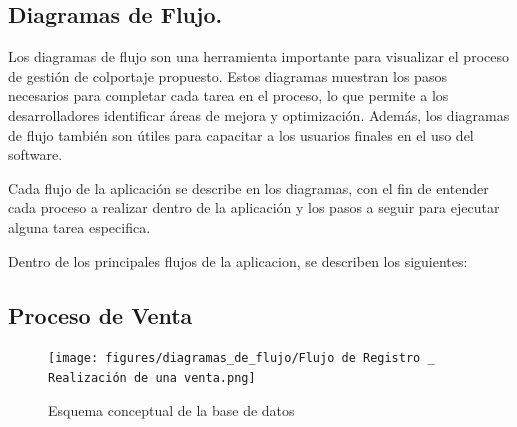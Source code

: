 \documentclass[runningheads]{llncs}
\begin{document}
\subsection{Diagramas de Flujo.}
Los diagramas de flujo son una herramienta importante para visualizar el proceso de gestión de colportaje propuesto. Estos diagramas muestran los pasos necesarios para completar cada tarea en el proceso, lo que permite a los desarrolladores identificar áreas de mejora y optimización. Además, los diagramas de flujo también son útiles para capacitar a los usuarios finales en el uso del software.

Cada flujo de la aplicación se describe en los diagramas, con el fin de entender cada proceso a realizar dentro de la aplicación y los pasos a seguir para ejecutar alguna tarea especifica.

Dentro de los principales flujos de la aplicacion, se describen los siguientes:
\subsection*{Proceso de Venta}
\begin{figure}[H]
	\centering\captionsetup{width=0.8\textwidth}
	\texttt{[image: figures/diagramas\_de\_flujo/Flujo de Registro \_ Realización de una venta.png]}
	\caption{Esquema conceptual de la base de datos} \label{fig1}
\end{figure}
\end{document}
